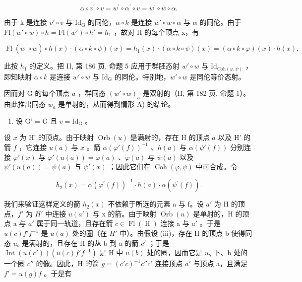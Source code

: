 \[
\alpha \circ v ^ {\prime} \circ v = w ^ {\prime} \circ \alpha^ {\prime} \circ v = w ^ {\prime} \circ w \circ \alpha .
\]

由于 k 是连接 \(v'\circ v\) 与 \(\mathrm{Id}_{\mathrm{G}}\) 的同伦，\(\alpha\circ k\) 是连接 \(w'\circ w\circ\alpha\) 与 \(\alpha\) 的同伦。由于 \(\mathrm{Fl}(w'\circ w)\circ h=\mathrm{Fl}(w')\circ h'=h_{1}\) ，故对 H 的每个顶点 x，有

\[
\operatorname{Fl} \left(w ^ {\prime} \circ w\right) \circ h (x) \cdot (\alpha \circ k \circ \psi) (x) = h _ {1} (x) \cdot (\alpha \circ k \circ \psi) (x) = (\alpha \circ k \circ \varphi) (x) \cdot h (x),
\]

此按 \(h_1\) 的定义。把 II, 第 186 页, 命题 5 应用于群胚态射 \(w' \circ w\) 与 \(\mathrm{Id}_{\mathrm{Coh}(\varphi, \psi)}\) ，即知映射 \(\alpha \circ k\) 是连接 \(w' \circ w\) 与 \(\mathrm{Id}_{\mathrm{G}}\) 的同伦。特别地，\(w' \circ w\) 是同伦等价态射。

因而对 G 的每个顶点 \(a\) ，群同态 \((w' \circ w)_a\) 是双射的（II, 第 182 页, 命题 1）。由此推出同态 \(w_a\) 是单射的，从而得到情形 A) 的结论。

\begin{enumerate}
\def\labelenumi{\arabic{enumi})}
\setcounter{enumi}{1}
\tightlist
\item
  设 G' = G 且 \(v = \mathrm{Id}_{\mathrm{G}}\) 。
\end{enumerate}

设 \(x\) 为 H' 的顶点。由于映射 \(\operatorname{Orb}(u)\) 是满射的，存在 H 的顶点 \(a\) 以及 H' 的箭 \(f\) ，它连接 \(u(a)\) 与 \(x\) 。箭 \(\alpha(\varphi'(f))^{-1}\) 、\(h(a)\) 与 \(\alpha(\psi'(f))\) 分别连接 \(\varphi'(x)\) 与 \(\varphi'(u(a)) = \varphi(a)\) 、\(\varphi(a)\) 与 \(\psi(a)\) 以及 \(\psi'(u(a)) = \psi(a)\) 与 \(\psi'(x)\) ；因此它们在 \(\operatorname{Coh}(\varphi, \psi)\) 中可合成。令

\[
h _ {2} (x) = \alpha (\varphi^ {\prime} (f)) ^ {- 1} \cdot h (a) \cdot \alpha (\psi^ {\prime} (f)).
\]

我们来验证这样定义的箭 \(h_{2}(x)\) 不依赖于所选的元素 a 与 f。设 \(a'\) 为 H 的顶点，\(f'\) 为 \(H'\) 中连接 \(u(a')\) 与 x 的箭。由于映射 \(\operatorname{Orb}(u)\) 是单射的，H 的顶点 a 与 \(a'\) 属于同一轨道，且存在箭 \(c \in \operatorname{Fl}(\operatorname{H})\) 连接 a 与 \(a'\) 。于是 \(u(c)f'f^{-1}\) 是 \(u(a)\) 处的圈（在 \(H'\) 中）。由假设 (iii)，存在 H 的顶点 b 使得同态 \(u_{b}\) 是满射的，且存在 H 的从 b 到 a 的箭 \(c'\) ；于是 \(\operatorname{Int}(u(c'))(u(c)f'f^{-1})\) 是 H 中 \(u(b)\) 处的圈，因而它是 \(u_{b}\) 下、b 处的一个圈 \(c''\) 的像。因此，H 的箭 \(g = (c'c)^{-1}c''c'\) 连接顶点 \(a'\) 与顶点 a，且满足 \(f' = u(g)f\) 。于是有

